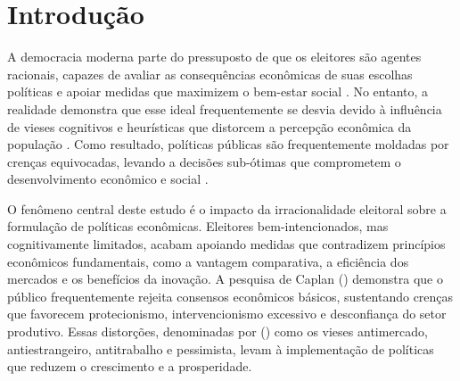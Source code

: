 

\chapter{Introdução} %


A democracia moderna parte do pressuposto de que os eleitores são agentes racionais, capazes de avaliar as consequências econômicas de suas escolhas políticas e apoiar medidas que maximizem o bem-estar social \cite{downs1957economic}. No entanto, a realidade demonstra que esse ideal frequentemente se desvia devido à influência de vieses cognitivos e heurísticas que distorcem a percepção econômica da população \cite{The_Myth_of_the_Rational_Voter,kahneman2011thinking}. Como resultado, políticas públicas são frequentemente moldadas por crenças equivocadas, levando a decisões sub-ótimas que comprometem o desenvolvimento econômico e social \cite{acemoglu2012nations}.

O fenômeno central deste estudo é o impacto da irracionalidade eleitoral sobre a formulação de políticas econômicas. Eleitores bem-intencionados, mas cognitivamente limitados, acabam apoiando medidas que contradizem princípios econômicos fundamentais, como a vantagem comparativa, a eficiência dos mercados e os benefícios da inovação. A pesquisa de Caplan (\citeyear{Systematically_Biased_Beliefs_about_Economics,The_Myth_of_the_Rational_Voter}) demonstra que o público frequentemente rejeita consensos econômicos básicos, sustentando crenças que favorecem protecionismo, intervencionismo excessivo e desconfiança do setor produtivo. Essas distorções, denominadas por  (\citeyear{The_Myth_of_the_Rational_Voter}) como os vieses antimercado, antiestrangeiro, antitrabalho e pessimista, levam à implementação de políticas que reduzem o crescimento e a prosperidade.

